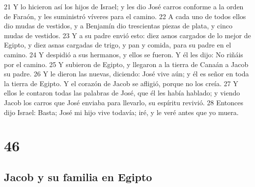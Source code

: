 21 Y lo hicieron así los hijos de Israel; y les dio José carros conforme a la orden de Faraón, y les suministró víveres para el camino.
22 A cada uno de todos ellos dio mudas de vestidos, y a Benjamín dio trescientas piezas de plata, y cinco mudas de vestidos.
23 Y a su padre envió esto: diez asnos cargados de lo mejor de Egipto, y diez asnas cargadas de trigo, y pan y comida, para su padre en el camino.
24 Y despidió a sus hermanos, y ellos se fueron. Y él les dijo: No riñáis por el camino.
25 Y subieron de Egipto, y llegaron a la tierra de Canaán a Jacob su padre.
26 Y le dieron las nuevas, diciendo: José vive aún; y él es señor en toda la tierra de Egipto. Y el corazón de Jacob se afligió, porque no los creía.
27 Y ellos le contaron todas las palabras de José, que él les había hablado; y viendo Jacob los carros que José enviaba para llevarlo, su espíritu revivió.
28 Entonces dijo Israel: Basta; José mi hijo vive todavía; iré, y le veré antes que yo muera.

\chapter{46}

\section*{Jacob y su familia en Egipto}

